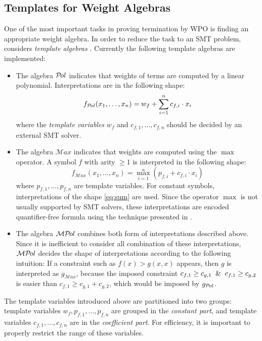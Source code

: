 \documentclass{llncs}
\def\Amax{{\mathcal{M}ax}}
\def\Apol{{\mathcal{P}\kern-.1emol}}
\def\Amp{{\mathcal{M}\Apol}}
\begin{document}
\subsection{Templates for Weight Algebras}

One of the most important tasks
in proving termination by WPO is finding an appropriate weight algebra.
In order to reduce the task to an SMT problem,
\NaTT considers \emph{template algebras}
.
Currently the following template algebras are implemented:

\begin{itemize}
\item
	The algebra $\Apol$ indicates that
	weights of terms are computed by a linear polynomial.
	Interpretations are in the following shape:
	\begin{equation}\label{eq:sum}
		f_\Apol(x_1,\dots,x_n) =
		w_{f} + \sum_{i=1}^n{c_{f,i} \cdot x_i}
	\end{equation}
	where
	the \emph{template variables}
	$w_f$ and $c_{f,1}, \dots, c_{f,n}$
	should be decided by an external SMT solver.
\smallskip
\item
	The algebra $\Amax$ indicates that
	weights are computed using the $\max$ operator.
	A symbol $f$ with arity $\ge 1$ is interpreted in the following shape:
	\begin{equation}\label{eq:max}
		f_\Amax(x_1,\dots,x_n) = 
		\max_{i=1}^{n} (p_{f,i} + c_{f,i} \cdot x_i)
	\end{equation}
	where $p_{f,1},\dots,p_{f,n}$ are template variables.
	For constant symbols,
	interpretations of the shape \eqref{eq:sum} are used.
	Since the operator $\max$ is not usually supported by SMT solvers,
	these interpretations are encoded  quantifier-free formula using
	the technique presented in \cite{YKS13}.
\smallskip
\item
	The algebra $\Amp$ combines both form of interpretations described above.
	Since it is inefficient to consider all combination of these interpretations,
	$\Amp$ decides the shape of interpretations according to the following
	intuition:
	If a constraint such as $f(x) > g(x,x)$ appears, then
	$g$ is interpreted as $g_\Amax$,
	because the imposed constraint
	$c_{f,1} \ge c_{g,1} \And c_{f,1} \ge c_{g,2}$
	is easier than
	$c_{f,1} \ge c_{g,1} + c_{g,2}$, which would be imposed
	by $g_\Apol$.
\end{itemize}

The template variables introduced above are partitioned into two groups:
template variables $w_f, p_{f,1},\dots,p_{f,n}$ are grouped in the \emph{constant part},
and template variables $c_{f,1},\dots,c_{f,n}$ are in the \emph{coefficient part}.
For efficiency,
it is important to properly restrict the range of these variables.
\end{document}
